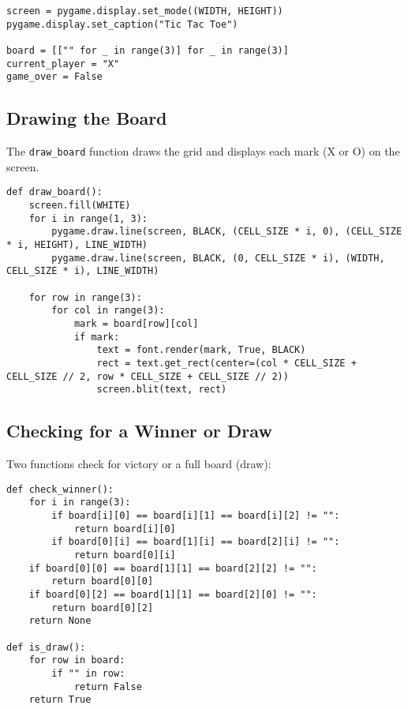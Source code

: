 \documentclass{article}
\begin{document}
\begin{lstlisting}[style=pythonstyle]
screen = pygame.display.set_mode((WIDTH, HEIGHT))
pygame.display.set_caption("Tic Tac Toe")

board = [["" for _ in range(3)] for _ in range(3)]
current_player = "X"
game_over = False
\end{lstlisting}

\newpage

\subsection{Drawing the Board}

The \texttt{draw\_board} function draws the grid and displays each mark (X or O) on the screen.

\begin{lstlisting}[style=pythonstyle]
def draw_board():
    screen.fill(WHITE)
    for i in range(1, 3):
        pygame.draw.line(screen, BLACK, (CELL_SIZE * i, 0), (CELL_SIZE * i, HEIGHT), LINE_WIDTH)
        pygame.draw.line(screen, BLACK, (0, CELL_SIZE * i), (WIDTH, CELL_SIZE * i), LINE_WIDTH)

    for row in range(3):
        for col in range(3):
            mark = board[row][col]
            if mark:
                text = font.render(mark, True, BLACK)
                rect = text.get_rect(center=(col * CELL_SIZE + CELL_SIZE // 2, row * CELL_SIZE + CELL_SIZE // 2))
                screen.blit(text, rect)
\end{lstlisting}

\subsection{Checking for a Winner or Draw}

Two functions check for victory or a full board (draw):

\begin{lstlisting}[style=pythonstyle]
def check_winner():
    for i in range(3):
        if board[i][0] == board[i][1] == board[i][2] != "":
            return board[i][0]
        if board[0][i] == board[1][i] == board[2][i] != "":
            return board[0][i]
    if board[0][0] == board[1][1] == board[2][2] != "":
        return board[0][0]
    if board[0][2] == board[1][1] == board[2][0] != "":
        return board[0][2]
    return None

def is_draw():
    for row in board:
        if "" in row:
            return False
    return True
\end{lstlisting}
\end{document}
